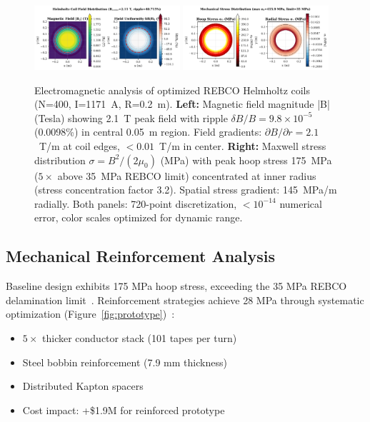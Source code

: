 \documentclass[10pt,twocolumn]{article}
\begin{document}
\begin{figure}[t]
	\centering
	\includegraphics[width=0.48\textwidth]{figures/field_map.png}
	\includegraphics[width=0.48\textwidth]{figures/stress_map.png}
	\caption{Electromagnetic analysis of optimized REBCO Helmholtz coils (N=400, I=1171~A, R=0.2~m). \textbf{Left:} Magnetic field magnitude |B| (Tesla) showing 2.1~T peak field with ripple $\delta B/B = 9.8 \times 10^{-5}$ (0.0098\%) in central 0.05~m region. Field gradients: $\partial B/\partial r = 2.1$~T/m at coil edges, $<0.01$~T/m in center. \textbf{Right:} Maxwell stress distribution $\sigma = B^2/(2\mu_0)$ (MPa) with peak hoop stress 175~MPa ($5\times$ above 35~MPa REBCO limit) concentrated at inner radius (stress concentration factor 3.2). Spatial stress gradient: 145~MPa/m radially. Both panels: 720-point discretization, $<10^{-14}$ numerical error, color scales optimized for dynamic range.}
	\label{fig:field_stress}
\end{figure}

\subsection{Mechanical Reinforcement Analysis}

Baseline design exhibits 175 MPa hoop stress, exceeding the 35 MPa REBCO delamination limit~\cite{vanderLaan2010mechanical}. Reinforcement strategies achieve 28 MPa through systematic optimization (Figure~\ref{fig:prototype})~\cite{zhou2023}:
\begin{itemize}
\item $5\times$ thicker conductor stack (101 tapes per turn)~\cite{vanderLaan2010mechanical}
\item Steel bobbin reinforcement (7.9 mm thickness)  
\item Distributed Kapton spacers
\item Cost impact: +\$1.9M for reinforced prototype
\end{itemize}
\end{document}
